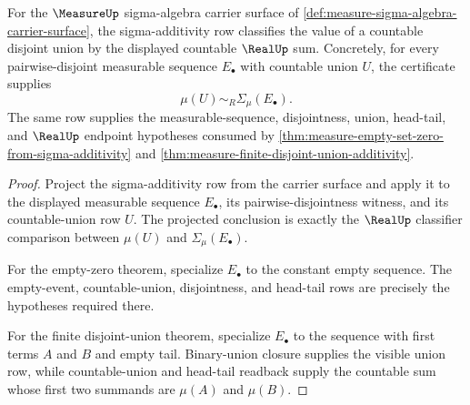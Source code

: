 \begin{theorem}
\label{thm:measure-sigma-additivity-obligation}
For the $\MeasureUp$ sigma-algebra carrier surface of
\autoref{def:measure-sigma-algebra-carrier-surface}, the sigma-additivity row
classifies the value of a countable disjoint union by the displayed countable
$\RealUp$ sum. Concretely, for every pairwise-disjoint measurable sequence
$E_\bullet$ with countable union $U$, the certificate supplies
$$
\mu(U)\sim_R\Sigma_\mu(E_\bullet).
$$
The same row supplies the measurable-sequence, disjointness, union, head-tail,
and $\RealUp$ endpoint hypotheses consumed by
\autoref{thm:measure-empty-set-zero-from-sigma-additivity} and
\autoref{thm:measure-finite-disjoint-union-additivity}.
\end{theorem}
\begin{proof}
Project the sigma-additivity row from the carrier surface and apply it to the
displayed measurable sequence $E_\bullet$, its pairwise-disjointness witness,
and its countable-union row $U$. The projected conclusion is exactly the
$\RealUp$ classifier comparison between $\mu(U)$ and
$\Sigma_\mu(E_\bullet)$.

For the empty-zero theorem, specialize $E_\bullet$ to the constant empty
sequence. The empty-event, countable-union, disjointness, and head-tail rows
are precisely the hypotheses required there.

For the finite disjoint-union theorem, specialize $E_\bullet$ to the sequence
with first terms $A$ and $B$ and empty tail. Binary-union closure supplies the
visible union row, while countable-union and head-tail readback supply the
countable sum whose first two summands are $\mu(A)$ and $\mu(B)$.
\end{proof}


